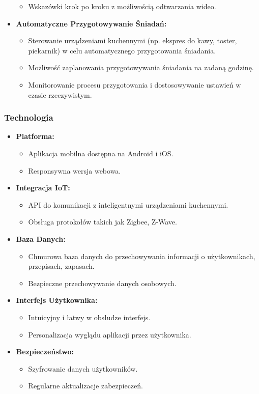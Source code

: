 \documentclass[a4paper,12pt]{article}
\begin{document}
\begin{itemize}
\begin{itemize}
        \item Wskazówki krok po kroku z możliwością odtwarzania wideo.
    \end{itemize}
    \item \textbf{Automatyczne Przygotowywanie Śniadań:}
    \begin{itemize}
        \item Sterowanie urządzeniami kuchennymi (np. ekspres do kawy, toster, piekarnik) w celu automatycznego przygotowania śniadania.
        \item Możliwość zaplanowania przygotowywania śniadania na zadaną godzinę.
        \item Monitorowanie procesu przygotowania i dostosowywanie ustawień w czasie rzeczywistym.
    \end{itemize}
\end{itemize}

\subsubsection{Technologia}
\begin{itemize}
    \item \textbf{Platforma:}
    \begin{itemize}
        \item Aplikacja mobilna dostępna na Android i iOS.
        \item Responsywna wersja webowa.
    \end{itemize}
    \item \textbf{Integracja IoT:}
    \begin{itemize}
        \item API do komunikacji z inteligentnymi urządzeniami kuchennymi.
        \item Obsługa protokołów takich jak Zigbee, Z-Wave.
    \end{itemize}
    \item \textbf{Baza Danych:}
    \begin{itemize}
        \item Chmurowa baza danych do przechowywania informacji o użytkownikach, przepisach, zapasach.
        \item Bezpieczne przechowywanie danych osobowych.
    \end{itemize}
    \item \textbf{Interfejs Użytkownika:}
    \begin{itemize}
        \item Intuicyjny i łatwy w obsłudze interfejs.
        \item Personalizacja wyglądu aplikacji przez użytkownika.
    \end{itemize}
    \item \textbf{Bezpieczeństwo:}
    \begin{itemize}
        \item Szyfrowanie danych użytkowników.
        \item Regularne aktualizacje zabezpieczeń.
    \end{itemize}
\end{itemize}
\end{document}
